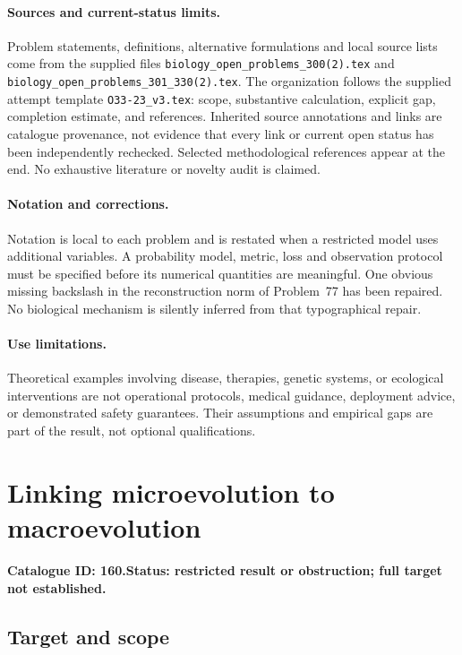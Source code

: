 \documentclass[11pt]{article}
\begin{document}
\paragraph{Sources and current-status limits.}
Problem statements, definitions, alternative formulations and local source lists
come from the supplied files
\texttt{biology\_open\_problems\_300(2).tex} and
\texttt{biology\_open\_problems\_301\_330(2).tex}.
The organization follows the supplied attempt template
\texttt{O33-23\_v3.tex}: scope, substantive calculation, explicit gap,
completion estimate, and references. Inherited source annotations and links are
catalogue provenance, not evidence that every link or current open status has
been independently rechecked. Selected methodological references appear at the
end. No exhaustive literature or novelty audit is claimed.

\paragraph{Notation and corrections.}
Notation is local to each problem and is restated when a restricted model uses
additional variables. A probability model, metric, loss and observation protocol
must be specified before its numerical quantities are meaningful. One obvious
missing backslash in the reconstruction norm of Problem~77 has been repaired.
No biological mechanism is silently inferred from that typographical repair.

\paragraph{Use limitations.}
Theoretical examples involving disease, therapies, genetic systems, or ecological
interventions are not operational protocols, medical guidance, deployment advice,
or demonstrated safety guarantees. Their assumptions and empirical gaps are part
of the result, not optional qualifications.

\setcounter{section}{159}
\section{Linking microevolution to macroevolution}
\label{prob:160}
\noindent\textbf{Catalogue ID: 160.}\quad \textbf{Status: restricted result or obstruction; full target not established.}
\subsection{Target and scope}
\end{document}

